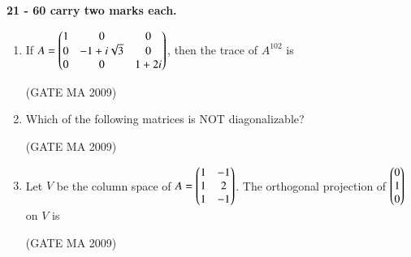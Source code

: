 \documentclass[journal,12pt,onecolumn]{IEEEtran}
\theoremstyle{remark}
\begin{document}
\vspace{0.6cm}
\textbf{21 - 60 carry two marks each.}

\begin{enumerate}[leftmargin=0pt, align=left, start=21]

\item If $A=
\begin{pmatrix}
1 & 0 & 0 \\
0 & -1+i\sqrt{3} & 0 \\
0 & 0 & 1+2i
\end{pmatrix}$, then the trace of $A^{102}$ is
\begin{enumerate}
\end{enumerate}
\hfill (GATE MA 2009)

\item Which of the following matrices is NOT diagonalizable?
\begin{enumerate}
\end{enumerate}
\hfill (GATE MA 2009)

\item Let $V$ be the column space of $A=\begin{pmatrix}1 & -1 \\ 1 & 2\\ 1 & -1\end{pmatrix}$. The orthogonal projection of $\begin{pmatrix}0 \\ 1 \\ 0\end{pmatrix}$ on $V$ is
\begin{enumerate}
\end{enumerate}
\hfill (GATE MA 2009)


\end{enumerate}
\end{document}
